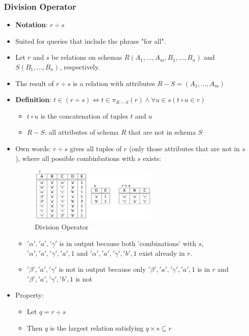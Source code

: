 \subsubsection{Division Operator}
\begin{itemize}
    \item \textbf{Notation}: $r \div s$
    \item Suited for queries that include the phrase "for all".
    \item Let $r$ and $s$ be relations on schemas $R(A_1,...,A_m,B_1,...,B_n)$ and $S(B_1,...,B_n)$, respectively.
    \item The result of $r \div s$ is a relation with attributes $R-S=(A_1,...,A_m)$
    \item \textbf{Definition}: $t\in (r \div s) \Leftrightarrow t \in \pi_{R-S}(r) \land \forall u \in s(t\circ u \in r)$
    \begin{itemize}
        \item $t \circ u$ is the concatenation of tuples $t$ and $u$
        \item $R-S$: all attributes of schema $R$ that are not in schema $S$
    \end{itemize}
    \item Own words: $r\div s$ gives all tuples of $r$ (only those attributes that are not in $s$), where all possible combinbations with $s$ exists: 

\begin{figure}[H]
\centering
\includegraphics[width=0.6\textwidth]{images/Screenshot 2024-05-04 at 09.59.38.jpg}
\caption{Division Operator}
\end{figure}
    \begin{itemize}
        \item $'\alpha','a','\gamma'$ is in output because both 'combinations' with $s$, $'\alpha','a','\gamma','a',1$ and $'\alpha','a','\gamma','b',1$ exist already in $r$.
        \item $'\beta','a','\gamma'$ is not in output because only $'\beta','a','\gamma','a',1$ is in $r$ and $'\beta','a','\gamma','b',1$ is not
    \end{itemize}
    \item Property: 
    \begin{itemize}
        \item Let $q=r\div s$
        \item Then $q$ is the largest relation satisfying $q\times s \subseteq r$
    \end{itemize}
\end{itemize}

